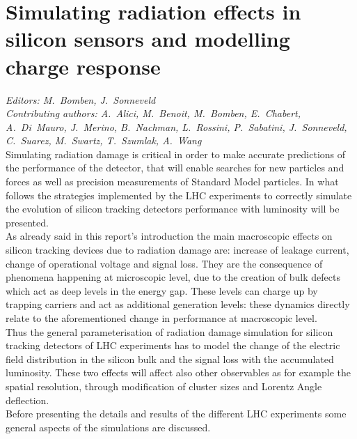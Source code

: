 \newcommand\T{\rule{0pt}{2.6ex}}
\newcommand\B{\rule[-1.2ex]{0pt}{0pt}}
\newcommand{\dndeta}{\ensuremath{\mathrm{d}N_{\rm ch}/\mathrm{d}\eta}}
\newcommand{\micro}{\ensuremath{\mu}}

\newcommand*\andnewline{%
        \end{tabular}
        \\[\bigskipamount]
        \begin{tabular}[t]{c}
}
\section{Simulating radiation effects in silicon sensors and modelling charge response}
\label{sec:sensorsim}
{\it Editors: M.~Bomben, J.~Sonneveld}  \\
{\it Contributing authors: A.~Alici, M.~Benoit, M.~Bomben, E.~Chabert, A.~Di~Mauro, J.~Merino, B.~Nachman, L.~Rossini, P.~Sabatini, J.~Sonneveld, C.~Suarez, M.~Swartz, T.~Szumlak, A.~Wang}  \\

\noindent
Simulating radiation damage is critical in order to make accurate predictions of the performance of the detector, that will enable searches for new particles and forces as well as precision measurements of Standard Model particles. In what 
follows the strategies implemented by the LHC experiments to correctly simulate the evolution  of silicon tracking detectors performance with luminosity
 will be presented. \\
As already said in this report's introduction the main macroscopic
 effects on silicon tracking devices due to radiation damage are: 
increase of leakage current, change of operational voltage and signal loss. They are the consequence of phenomena 
happening at microscopic level, due to the creation of bulk defects which act as deep levels in the energy gap. These 
levels can charge up by trapping carriers and act as additional generation levels: these dynamics directly relate to the
aforementioned change in performance at macroscopic level. \\
Thus the general parameterisation of radiation damage simulation for silicon tracking detectors of LHC experiments  has to model 
the change  of the electric field distribution in the silicon bulk  and 
the signal loss with the accumulated luminosity. These two effects will affect also other observables as for example the spatial resolution, through 
modification of cluster sizes and Lorentz Angle deflection. \\
Before presenting the details and results of the different LHC experiments some general aspects of the simulations 
are discussed.

